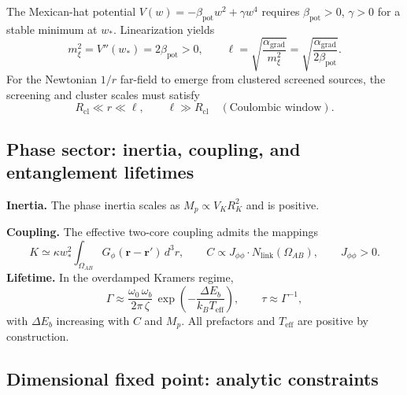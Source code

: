 \documentclass[11pt]{article}
\begin{document}
The Mexican-hat potential $V(w)=-\beta_{\mathrm{pot}} w^2 + \gamma w^4$ requires $\beta_{\mathrm{pot}}>0$, $\gamma>0$ for a stable minimum at $w_*$. Linearization yields
\begin{equation}
m_\xi^2 = V''(w_*) = 2\beta_{\mathrm{pot}} > 0,\qquad \ell = \sqrt{\frac{\alpha_{\mathrm{grad}}}{m_\xi^2}} = \sqrt{\frac{\alpha_{\mathrm{grad}}}{2\beta_{\mathrm{pot}}}}.
\end{equation}
For the Newtonian $1/r$ far-field to emerge from clustered screened sources, the screening and cluster scales must satisfy
\begin{equation}
R_{\mathrm{cl}} \ll r \ll \ell,\qquad \ell \gg R_{\mathrm{cl}}\quad (\text{Coulombic window}).
\end{equation}

\subsection{Phase sector: inertia, coupling, and entanglement lifetimes}

\textbf{Inertia.} The phase inertia scales as $M_p \propto V_K R_K^2$ and is positive.

\textbf{Coupling.} The effective two-core coupling admits the mappings
\begin{equation}
K \simeq \kappa w_*^2 \int_{\Omega_{AB}} G_\phi(\mathbf r-\mathbf r')\, d^3r,\qquad C \propto J_{\phi\phi} \cdot N_{\mathrm{link}}(\Omega_{AB}),\qquad J_{\phi\phi}>0.
\end{equation}
\textbf{Lifetime.} In the overdamped Kramers regime,
\begin{equation}
\Gamma \approx \frac{\omega_0\,\omega_b}{2\pi\,\zeta}\, \exp\!\left(-\frac{\Delta E_b}{k_B T_{\mathrm{eff}}}\right),\qquad \tau\approx\Gamma^{-1},
\end{equation}
with $\Delta E_b$ increasing with $C$ and $M_p$. All prefactors and $T_{\mathrm{eff}}$ are positive by construction.

\subsection{Dimensional fixed point: analytic constraints}
\end{document}
